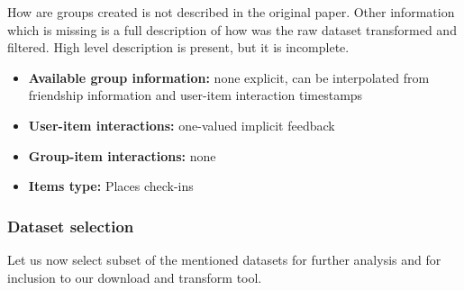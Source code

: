 How are groups created is not described in the original paper. Other information which is missing is a full description of how was the raw dataset transformed and filtered. High level description is present, but it is incomplete.


\begin{itemize}
    \item \textbf{Available group information:} none explicit, can be interpolated from friendship information and user-item interaction timestamps
    \item \textbf{User-item interactions:} one-valued implicit feedback
    \item \textbf{Group-item interactions:} none
    \item \textbf{Items type:} Places check-ins
\end{itemize}


\subsubsection{Dataset selection}
Let us now select subset of the mentioned datasets for further analysis and for inclusion to our download and transform tool.

